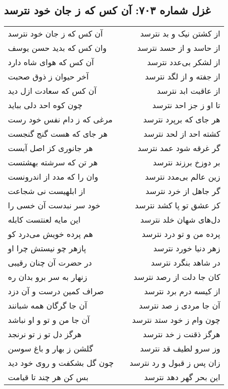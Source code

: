 \begin{center}
\section*{غزل شماره ۷۰۳: آن کس که ز جان خود نترسد}
\label{sec:0703}
\begin{longtable}{l p{0.5cm} r}
آن کس که ز جان خود نترسد
&&
از کشتن نیک و بد نترسد
\\
وان کس که بدید حسن یوسف
&&
از حاسد و از حسد نترسد
\\
آن کس که هوای شاه دارد
&&
از لشکر بی‌عدد نترسد
\\
آخر حیوان ز ذوق صحبت
&&
از جفته و از لگد نترسد
\\
آن کس که سعادت ازل دید
&&
از عاقبت ابد نترسد
\\
چون کوه احد دلی بباید
&&
تا او ز جز احد نترسد
\\
مرغی که ز دام نفس خود رست
&&
هر جای که برپرد نترسد
\\
هر جای که هست گنج گنجست
&&
کشته احد از لحد نترسد
\\
هر جانوری کز اصل آبست
&&
گر غرقه شود عمد نترسد
\\
هر تن که سرشته بهشتست
&&
بر دوزخ برزند نترسد
\\
وان را که مدد از اندرونست
&&
زین عالم بی‌مدد نترسد
\\
از ابلهیست نی شجاعت
&&
گر جاهل از خرد نترسد
\\
خود سر نبدست آن خسی را
&&
کز عشق تو پا کشد نترسد
\\
این مایه لعنتست کابله
&&
دل‌های شهان خلد نترسد
\\
هم پرده خویش می‌درد کو
&&
پرده من و تو درد نترسد
\\
پازهر چو نیستش چرا او
&&
زهر دنیا خورد نترسد
\\
در حضرت آن چنان رقیبی
&&
در شاهد بنگرد نترسد
\\
زنهار به سر برو بدان ره
&&
کان جا دلت از رصد نترسد
\\
صراف کمین درست و آن دزد
&&
از کیسه درم برد نترسد
\\
آن جا گرگان همه شبانند
&&
آن جا مردی ز صد نترسد
\\
آن جا من و تو و او نباشد
&&
چون وام ز خود ستد نترسد
\\
هرگز دل تو ز تو نرنجد
&&
هرگز ذقنت ز خد نترسد
\\
گلشن ز بهار و باغ سوسن
&&
وز سرو لطیف قد نترسد
\\
چون گل بشکفت و روی خود دید
&&
زان پس ز قبول و رد نترسد
\\
بس کن هر چند تا قیامت
&&
این بحر گهر دهد نترسد
\\
\end{longtable}
\end{center}
